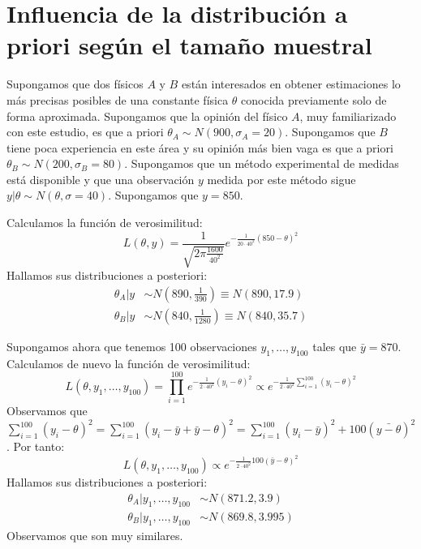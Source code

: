\section{Influencia de la distribución a priori según el tamaño muestral}
\begin{example}
    Supongamos que dos físicos $A$ y $B$ están interesados en obtener estimaciones lo más precisas posibles de una constante física $\theta$ conocida previamente solo de forma aproximada.
    Supongamos que la opinión del físico $A$, muy familiarizado con este estudio, es que a priori $\theta_A \sim N(900, \sigma_A = 20)$.
    Supongamos que $B$ tiene poca experiencia en este área y su opinión más bien vaga es que a priori $\theta_B \sim N(200, \sigma_B = 80)$.
    Supongamos que un método experimental de medidas está disponible y que una observación $y$ medida por este método sigue $y|\theta \sim N(\theta, \sigma = 40)$.
    Supongamos que $y = 850$.

    Calculamos la función de verosimilitud:
    $$L(\theta, y) = \frac{1}{\sqrt{2\pi \frac{1600}{40^2}}} e^{-\frac{1}{20 \cdot 40^2}(850-\theta)^2}$$
    Hallamos sus distribuciones a posteriori:
    \begin{align*}
        \theta_A|y & \sim N\left(890, \frac{1}{390}\right) \equiv N(890, 17.9)  \\
        \theta_B|y & \sim N\left(840, \frac{1}{1280}\right) \equiv N(840, 35.7)
    \end{align*}

    Supongamos ahora que tenemos 100 observaciones $y_1, \dots, y_{100}$ tales que $\bar{y} = 870$.
    Calculamos de nuevo la función de verosimilitud:
    $$L(\theta, y_1, \dots, y_{100}) = \prod_{i=1}^{100} e^{-\frac{1}{2 \cdot 40^2}(y_i-\theta)^2} \propto e^{-\frac{1}{2 \cdot 40^2} \sum_{i=1}^{100} (y_i-\theta)^2}$$
    Observamos que $\sum_{i=1}^{100} (y_i-\theta)^2 = \sum_{i=1}^{100} (y_i-\bar{y}+\bar{y}-\theta)^2 = \sum_{i=1}^{100} (y_i-\bar{y})^2 + 100(\bar{y-\theta})^2$.
    Por tanto:
    $$L(\theta, y_1, \dots, y_{100}) \propto e^{-\frac{1}{2 \cdot 40^2} 100(\bar{y}-\theta)^2}$$
    Hallamos sus distribuciones a posteriori:
    \begin{align*}
        \theta_A|y_1, \dots, y_{100} & \sim N(871.2, 3.9)   \\
        \theta_B|y_1, \dots, y_{100} & \sim N(869.8, 3.995)
    \end{align*}
    Observamos que son muy similares.
\end{example}